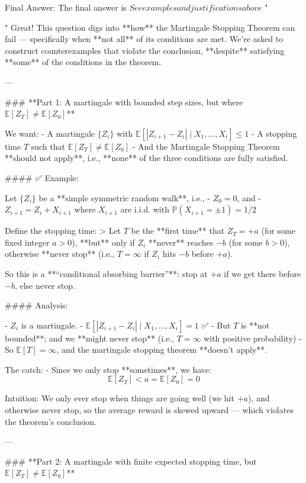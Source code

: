 \begin{enumerate}
\begin{shaded}
Final Answer: The final answer is $\boxed{See examples and justifications above}$
"

"
Great! This question digs into **how** the Martingale Stopping Theorem can fail — specifically when **not all** of its conditions are met. We're asked to construct counterexamples that violate the conclusion, **despite** satisfying **some** of the conditions in the theorem.

---

### **Part 1: A martingale with bounded step sizes, but where $\mathbb{E}[Z_T] \ne \mathbb{E}[Z_0]$**

We want:
- A martingale $\{Z_i\}$ with $\mathbb{E}[|Z_{i+1} - Z_i| \mid X_1, \dots, X_i] \le 1$
- A stopping time $T$ such that $\mathbb{E}[Z_T] \ne \mathbb{E}[Z_0]$
- And the Martingale Stopping Theorem **should not apply**, i.e., **none** of the three conditions are fully satisfied.

#### ✅ Example:

Let $\{Z_i\}$ be a **simple symmetric random walk**, i.e.,  
- $Z_0 = 0$, and  
- $Z_{i+1} = Z_i + X_{i+1}$ where $X_{i+1}$ are i.i.d. with $\mathbb{P}(X_{i+1} = \pm1) = 1/2$

Define the stopping time:
> Let $T$ be the **first time** that $Z_T = +a$ (for some fixed integer $a > 0$), **but** only if $Z_i$ **never** reaches $-b$ (for some $b > 0$), otherwise **never stop** (i.e., $T = \infty$ if $Z_i$ hits $-b$ before $+a$).

So this is a **“conditional absorbing barrier”**: stop at $+a$ if we get there before $-b$, else never stop.

#### Analysis:

- $Z_i$ is a martingale.  
- $\mathbb{E}[|Z_{i+1} - Z_i| \mid X_1, \dots, X_i] = 1$ ✅  
- But $T$ is **not bounded**; and we **might never stop** (i.e., $T = \infty$ with positive probability)  
- So $\mathbb{E}[T] = \infty$, and the martingale stopping theorem **doesn't apply**.

The catch:
- Since we only stop **sometimes**, we have:
  $$
  \mathbb{E}[Z_T] < a = \mathbb{E}[Z_0] = 0
  $$

Intuition: We only ever stop when things are going well (we hit $+a$), and otherwise never stop, so the average reward is skewed upward — which violates the theorem's conclusion.

---

### **Part 2: A martingale with finite expected stopping time, but $\mathbb{E}[Z_T] \ne \mathbb{E}[Z_0]$**


\end{shaded}
\end{enumerate}
